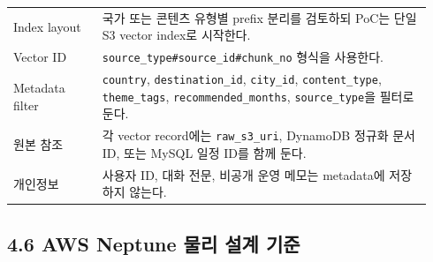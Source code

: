 \documentclass[12pt,a4paper]{article}
\newcommand{\DocNeedspace}[1]{\par\ifdim\dimexpr\pagegoal-\pagetotal\relax<#1\newpage\fi}
\begin{document}
\DocNeedspace{16\baselineskip}
\begin{small}
\begin{longtable}{@{}>{\centering\arraybackslash}m{0.200\linewidth}>{\RaggedRight\arraybackslash}m{0.740\linewidth}@{}}
\toprule
\multicolumn{1}{>{\centering\arraybackslash}m{0.200\linewidth}}{\textbf{기준}} & \multicolumn{1}{>{\centering\arraybackslash}m{0.740\linewidth}}{\textbf{결정}} \\
\midrule
\endhead
Index layout & 국가 또는 콘텐츠 유형별 prefix 분리를 검토하되 PoC는 단일 S3 vector index로 시작한다. \\
Vector ID & \texttt{source\_\allowbreak{}type\#\allowbreak{}source\_\allowbreak{}id\#\allowbreak{}chunk\_\allowbreak{}no} 형식을 사용한다. \\
Metadata filter & \texttt{country}, \texttt{destination\_\allowbreak{}id}, \texttt{city\_\allowbreak{}id}, \texttt{content\_\allowbreak{}type}, \texttt{theme\_\allowbreak{}tags}, \texttt{recommended\_\allowbreak{}months}, \texttt{source\_\allowbreak{}type}을 필터로 둔다. \\
원본 참조 & 각 vector record에는 \texttt{raw\_\allowbreak{}s3\_\allowbreak{}uri}, DynamoDB 정규화 문서 ID, 또는 MySQL 일정 ID를 함께 둔다. \\
개인정보 & 사용자 ID, 대화 전문, 비공개 운영 메모는 metadata에 저장하지 않는다. \\
\bottomrule
\end{longtable}
\end{small}


\DocNeedspace{10\baselineskip}
\subsection*{4.6 AWS Neptune 물리 설계 기준}
\end{document}

